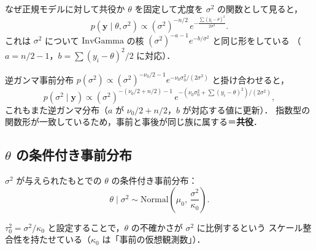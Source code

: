 \documentclass[lualatex,ja=standard,a4paper,12pt]{bxjsarticle}
\begin{document}
\begin{derivbox}{なぜ正規モデルに対して共役か}
$\theta$ を固定して尤度を $\sigma^2$ の関数として見ると，
\[
  p(\mathbf{y} \mid \theta, \sigma^2)
  \propto (\sigma^2)^{-n/2}\, e^{-\frac{\sum(y_i-\theta)^2}{2\sigma^2}}.
\]
これは $\sigma^2$ について $\mathrm{InvGamma}$ の核 $(\sigma^2)^{-a-1}e^{-b/\sigma^2}$ と同じ形をしている
（$a = n/2 - 1$，$b = \sum(y_i-\theta)^2/2$ に対応）．

逆ガンマ事前分布 $p(\sigma^2) \propto (\sigma^2)^{-\nu_0/2-1} e^{-\nu_0\sigma_0^2/(2\sigma^2)}$ と掛け合わせると，
\[
  p(\sigma^2 \mid \mathbf{y})
  \propto (\sigma^2)^{-(\nu_0/2 + n/2)-1}\, e^{-(\nu_0\sigma_0^2 + \sum(y_i-\theta)^2)/(2\sigma^2)},
\]
これもまた逆ガンマ分布（$a$ が $\nu_0/2 + n/2$，$b$ が対応する値に更新）．
指数型の関数形が一致しているため，事前と事後が同じ族に属する＝\textbf{共役}．
\end{derivbox}

\begin{center}
\end{center}

\subsection{$\theta$ の条件付き事前分布}

$\sigma^2$ が与えられたもとでの $\theta$ の条件付き事前分布：
\[
  \theta \mid \sigma^2 \sim \mathrm{Normal}\!\left(\mu_0,\, \frac{\sigma^2}{\kappa_0}\right).
\]

$\tau_0^2 = \sigma^2/\kappa_0$ と設定することで，$\theta$ の不確かさが $\sigma^2$ に比例するという
スケール整合性を持たせている（$\kappa_0$ は「事前の仮想観測数」）．
\end{document}

